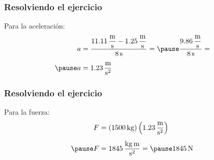 \documentclass[14pt]{beamer}
\begin{document}
\begin{frame}
\frametitle{Resolviendo el ejercicio}
 Para la aceleración:
\pause
\begin{eqnarray*}
\begin{aligned}
a &= \dfrac{ \displaystyle \SI[per-mode=fraction]{11.11}{\meter\per\second} - \SI[per-mode=fraction]{1.25}{\meter\per\second}}{\SI{8}{\second}} = \pause \dfrac{\displaystyle \SI[per-mode=fraction]{9.86}{\meter\per\second}}{\SI{8}{\second}} = \\[0.5em] \pause
a &= \SI[per-mode=fraction]{1.23}{\meter\per\square\second}
\end{aligned}
\end{eqnarray*}  
\end{frame}
\begin{frame}
\frametitle{Resolviendo el ejercicio}
 Para la fuerza:
\pause
\begin{eqnarray*}
\begin{aligned}
F &= \left( \SI{1500}{\kilo\gram} \right) \left( \SI[per-mode=fraction]{1.23}{\meter\per\square\second} \right) \\[0.5em] \pause
F &= \SI[per-mode=fraction]{1845}{\kilo\gram\meter\per\square\second} = \pause \SI{1845}{\newton}
\end{aligned}
\end{eqnarray*}  
\end{frame}

\end{document}
